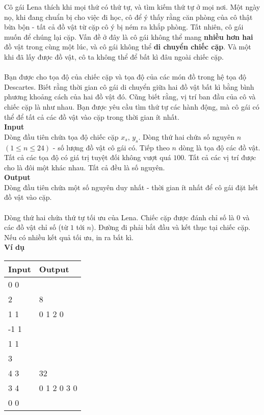 Cô gái Lena thích khi mọi thứ có thứ tự, và tìm kiếm thứ tự ở mọi nơi. Một ngày nọ, khi đang chuẩn bị cho việc đi học, cô để ý thấy rằng căn phòng của cô thật bừa bộn - tất cả đồ vật từ cặp cô ý bị ném ra khắp phòng. Tất nhiên, cô gái muốn để chúng lại cặp. Vấn đề ở đây là cô gái không thể mang \textbf{nhiều hơn hai} đồ vật trong cùng một lúc, và cô gái không thể \textbf{di chuyển chiếc cặp}. Và một khi đã lấy được đồ vật, cô ta không thể để bất kì đâu ngoài chiếc cặp.
\\
\\
Bạn được cho tọa độ của chiếc cặp và tọa độ của các món đồ trong hệ tọa độ Descartes. Biết rằng thời gian cô gái di chuyển giữa hai đồ vật bất kì bằng bình phương khoảng cách của hai đồ vật đó. Cũng biết rằng, vị trí ban đầu của cô và chiếc cặp là như nhau. Bạn được yêu cầu tìm thứ tự các hành động, mà cô gái có thể để tất cả các đồ vật vào cặp trong thời gian ít nhất.  
\\

\textbf{Input}
\\
Dòng đầu tiên chứa tọa độ chiếc cặp $x_{s}$, $y_{s}$. Dòng thứ hai chứa số nguyên $n$ $(1 \leq n \leq 24)$ - số lượng đồ vật cô gái có. Tiếp theo $n$ dòng là tọa độ các đồ vật. Tất cả các tọa độ có giá trị tuyệt đối không vượt quá $100$. Tất cả các vị trí được cho là đôi một khác nhau. Tất cả đều là số nguyên. 
\\

\textbf{Output}
\\
Dòng đầu tiên chứa một số nguyên duy nhất - thời gian ít nhất để cô gái đặt hết đồ vật vào cặp. \\
\\
Dòng thứ hai chứa thứ tự tối ưu của Lena. Chiếc cặp được đánh chỉ số là $0$ và các đồ vật chỉ số (từ $1$ tới $n$). Đường đi phải bắt đầu và kết thục tại chiếc cặp. Nếu có nhiều kết quả tối ưu, in ra bất kì.
\\

\textbf{Ví dụ}
\begin{table}[h!]
    \begin{center}
        \begin{tabular}{|p{7cm}|p{5cm}|}
            \hline
            \textbf{Input} & \textbf{Output} \\ 
            \hline
            0 0 & \\
            2 & 8 \\
            1 1 & 0 1 2 0\\
            -1 1 & \\
            \hline
            1 1 & \\
            3 & \\
            4 3 & 32 \\
            3 4 & 0 1 2 0 3 0 \\
            0 0 & \\
            \hline
        \end{tabular}
    \end{center}
\end{table}




